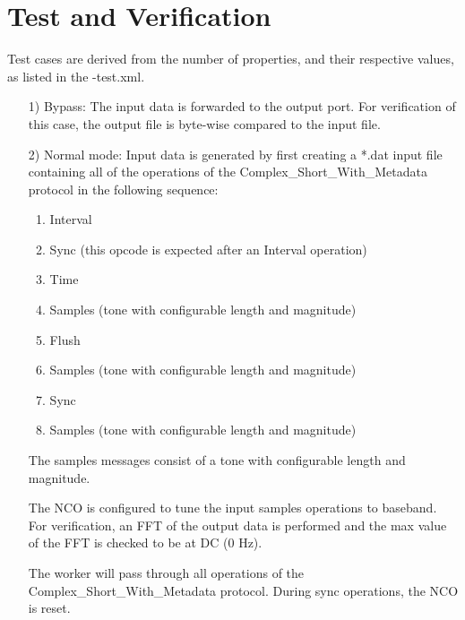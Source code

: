 \section*{Test and Verification}
Test cases are derived from the number of properties, and their respective values, as listed in the \comp-test.xml.
\begin{itemize}
	\item[1)] Bypass: The input data is forwarded to the output port. For verification of this case, the output file is byte-wise compared to the input file.
	\item[2)] Normal mode:
	Input data is generated by first creating a *.dat input file containing all of the operations of the Complex\_Short\_With\_Metadata protocol in the following sequence:
\begin{enumerate}
	\item Interval
	\item Sync (this opcode is expected after an Interval operation)
	\item Time
	\item Samples (tone with configurable length and magnitude)
	\item Flush	
	\item Samples (tone with configurable length and magnitude)
	\item Sync
	\item Samples (tone with configurable length and magnitude)
\end{enumerate}
The samples messages consist of a tone with configurable length and magnitude.\medskip

The NCO is configured to tune the input samples operations to baseband. For verification, an FFT of the output data is performed and the max value of the FFT is checked to be at DC (0 Hz).\medskip

The worker will pass through all operations of the Complex\_Short\_With\_Metadata protocol. During sync operations, the NCO is reset.

\end{itemize}


